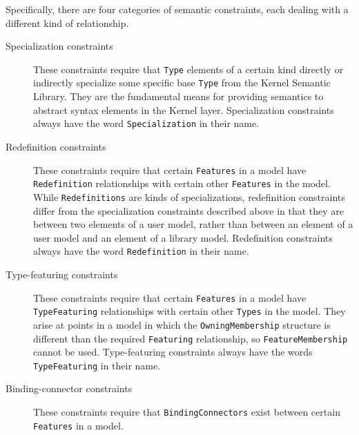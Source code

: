 \pn Specifically, there are four categories of semantic constraints, each dealing with a different kind of relationship.

\begin{description}
\item[Specialization constraints ] These constraints require that \texttt{Type} elements of a certain kind directly or
indirectly specialize some specific base \texttt{Type} from the Kernel Semantic Library. They are the fundamental
means for providing semantics to abstract syntax elements in the Kernel layer. Specialization constraints
always have the word \texttt{Specialization} in their name.
\item[Redefinition constraints ] These constraints require that certain \texttt{Features} in a model have \texttt{Redefinition} 
relationships with certain other \texttt{Features} in the model. While \texttt{Redefinitions} are kinds of
specializations, redefinition constraints differ from the specialization constraints described above in
that they are between two elements of a user model, rather than between an element of a user model and
an element of a library model. Redefinition constraints always have the word \texttt{Redefinition} in their
name.
\item[Type-featuring constraints ]  These constraints require that certain \texttt{Features} in a model have
 \texttt{TypeFeaturing} relationships with certain other  \texttt{Types} in the model. They arise at points in a model in
which the  \texttt{OwningMembership} structure is different than the required \texttt{Featuring} relationship, so
 \texttt{FeatureMem\-bership} cannot be used. Type-featuring constraints always have the words
 \texttt{TypeFeaturing} in their name.
\item[Binding-connector constraints ]  These constraints require that \texttt{BindingConnectors} exist between certain
\texttt{Features} in a model.
\end{description}







